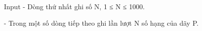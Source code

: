 Input
-       Dòng thứ nhất ghi số N, 1 ≤ N ≤ 1000.  

   -       Trong một số dòng tiếp theo ghi lần lượt N số hạng của dãy P.